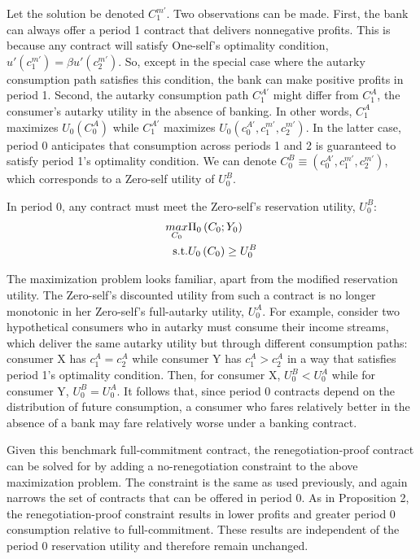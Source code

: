 \documentclass[11pt,english]{article}
\theoremstyle{plain}
\theoremstyle{definition}
\begin{document}
Let the solution be denoted $C_{1}^{m'}$. Two observations can be
made. First, the bank can always offer a period 1 contract that delivers
nonnegative profits. This is because any contract will satisfy One-self's
optimality condition, $u'\left(c_{1}^{m'}\right)=\beta u'\left(c_{2}^{m'}\right)$.
So, except in the special case where the autarky consumption path
satisfies this condition, the bank can make positive profits in period
1. Second, the autarky consumption path $C_{1}^{A'}$ might differ
from $C_{1}^{A}$, the consumer's autarky utility in the absence of
banking. In other words, $C_{1}^{A}$ maximizes $U_{0}\left(C_{0}^{A}\right)$
while $C_{1}^{A'}$ maximizes $U_{0}\left(c_{0}^{A'},c_{1}^{m'},c_{2}^{m'}\right)$.
In the latter case, period 0 anticipates that consumption across periods
1 and 2 is guaranteed to satisfy period 1's optimality condition.
We can denote $C_{0}^{B}\equiv\left(c_{0}^{A'},c_{1}^{m'},c_{2}^{m'}\right)$,
which corresponds to a Zero-self utility of $U_{0}^{B}$.

In period 0, any contract must meet the Zero-self's reservation utility,
$U_{0}^{B}$: 
\begin{align*}
\underset{C_{0}}{max} & \Pi_{0}\left(C_{0};Y_{0}\right)\\
\text{s.t.} & \text{\ensuremath{U_{0}\left(C_{0}\right)\geq U_{0}^{B}}}
\end{align*}

The maximization problem looks familiar, apart from the modified reservation
utility. The Zero-self's discounted utility from such a contract is
no longer monotonic in her Zero-self's full-autarky utility, $U_{0}^{A}$.
For example, consider two hypothetical consumers who in autarky must
consume their income streams, which deliver the same autarky utility
but through different consumption paths: consumer X has $c_{1}^{A}=c_{2}^{A}$
while consumer Y has $c_{1}^{A}>c_{2}^{A}$ in a way that satisfies
period 1's optimality condition. Then, for consumer X, $U_{0}^{B}<U_{0}^{A}$
while for consumer Y, $U_{0}^{B}=U_{0}^{A}$. It follows that, since
period 0 contracts depend on the distribution of future consumption,
a consumer who fares relatively better in the absence of a bank may
fare relatively worse under a banking contract.

Given this benchmark full-commitment contract, the renegotiation-proof
contract can be solved for by adding a no-renegotiation constraint
to the above maximization problem. The constraint is the same as used
previously, and again narrows the set of contracts that can be offered
in period 0. As in Proposition 2, the renegotiation-proof constraint
results in lower profits and greater period 0 consumption relative
to full-commitment. These results are independent of the period 0
reservation utility and therefore remain unchanged.
\end{document}

